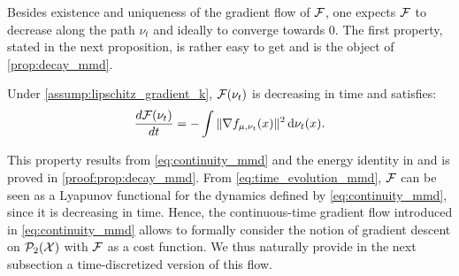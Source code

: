Besides existence and uniqueness of the gradient flow of ${{\mathcal F}}$, one expects ${{\mathcal F}}$ to decrease along the path $\nu_t$ and ideally to converge towards $0$. The first property, stated in the next proposition, is rather easy to get and is the object of \cref{prop:decay_mmd}.
\begin{proposition}\label{prop:decay_mmd}
	Under \cref{assump:lipschitz_gradient_k}, ${{\mathcal F}}(\nu_t)$ is decreasing in time and satisfies:
	\begin{align}\label{eq:time_evolution_mmd}
		\frac{d{{\mathcal F}}(\nu_t)}{dt}= - \int \Vert \nabla f_{\mu,\nu_t}(x) \Vert^2 \mathop{}\!\mathrm{d} \nu_t(x).  
	\end{align}
\end{proposition}
This property results from \cref{eq:continuity_mmd} and the energy identity in \cite[Theorem 11.3.2]{ambrosio2008gradient} and is proved in \cref{proof:prop:decay_mmd}. %
From \cref{eq:time_evolution_mmd}, ${{\mathcal F}}$ can be seen as a Lyapunov functional for the dynamics defined by \cref{eq:continuity_mmd}, since it is decreasing in time. Hence, the continuous-time gradient flow introduced in \cref{eq:continuity_mmd} allows to formally consider the notion of gradient descent on $\mathcal{P}_2({{\mathcal X}})$ with ${{\mathcal F}}$ as a cost function. We thus naturally provide in the next subsection a time-discretized version of this flow.

